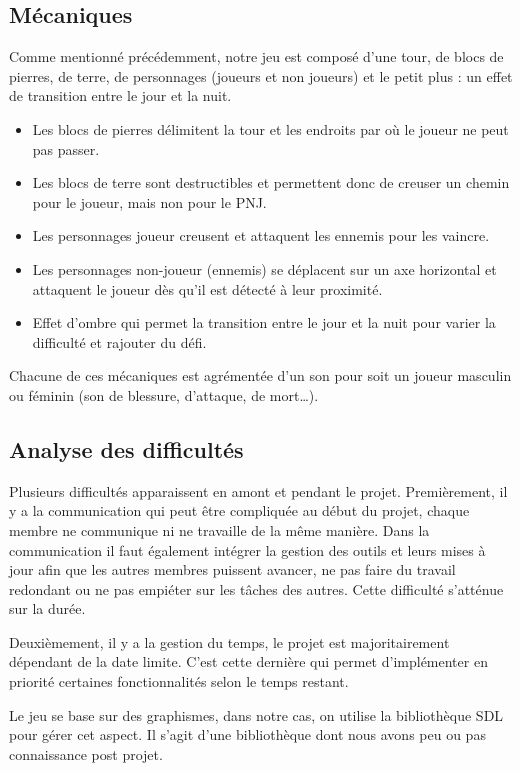 \documentclass[a4paper,12pt]{article}
\begin{document}
\subsection{Mécaniques}
Comme mentionné précédemment, notre jeu est composé d'une tour, de blocs de pierres, de terre, de personnages (joueurs et non joueurs) et le petit plus : un effet de transition entre le jour et la nuit.
\begin{itemize}
	\item Les blocs de pierres délimitent la tour et les endroits par où le joueur ne peut pas passer.
	\item Les blocs de terre sont destructibles et permettent donc de creuser un chemin pour le joueur, mais non pour le PNJ.
	\item Les personnages joueur creusent et attaquent les ennemis pour les vaincre.
	\item Les personnages non-joueur (ennemis) se déplacent sur un axe horizontal et attaquent le joueur dès qu'il est détecté à leur proximité.
	\item Effet d'ombre qui permet la transition entre le jour et la nuit pour varier la difficulté et rajouter du défi.
\end{itemize}

Chacune de ces mécaniques est agrémentée d'un son pour soit un joueur masculin ou féminin (son de blessure, d'attaque, de mort\dots).


\subsection{Analyse des difficultés}
Plusieurs difficultés apparaissent en amont et pendant le projet. 
Premièrement, il y a la communication qui peut être compliquée au début du projet, chaque membre ne communique ni ne travaille de la même manière. Dans la communication il faut également intégrer la gestion des outils et leurs mises à jour afin que les autres membres puissent avancer, ne pas faire du travail redondant ou ne pas empiéter sur les tâches des autres. Cette difficulté s'atténue sur la durée.

Deuxièmement, il y a la gestion du temps, le projet est majoritairement dépendant de la date limite. C’est cette dernière qui permet d’implémenter en priorité certaines fonctionnalités selon le temps restant.

Le jeu se base sur des graphismes, dans notre cas, on utilise la bibliothèque SDL pour gérer cet aspect. Il s’agit d’une bibliothèque dont nous avons peu ou pas connaissance post projet.
\end{document}
